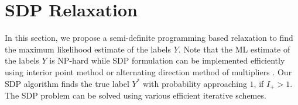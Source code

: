 \documentclass[conference]{IEEEtran}
\DeclareMathOperator{\Binom}{Binom}
\begin{document}
	

	
	\section{SDP Relaxation}\label{s:sdp}
	In this section, we propose a semi-definite programming based relaxation to find the maximum likelihood estimate of the labels $Y$. Note that
	the ML estimate of the labels $Y$ is NP-hard while
	SDP formulation can be implemented efficiently using
	interior point method
	or alternating direction method of multipliers \cite{boyd2011distributed}.
	Our SDP algorithm finds the true label $Y^*$ with probability approaching $1$, if
	$I_+ > 1$.
	The SDP problem can be solved using various efficient iterative schemes.
	
\end{document}
